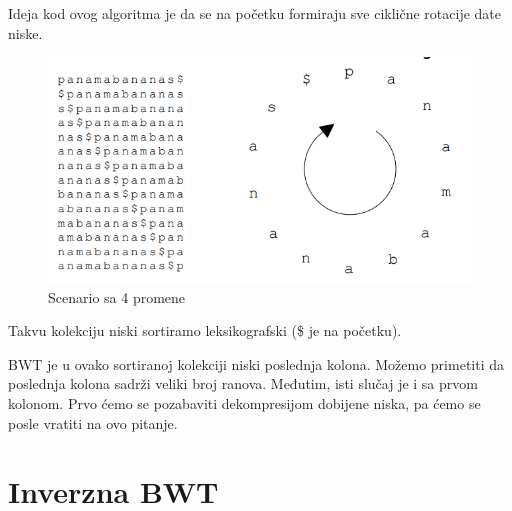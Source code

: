 Ideja kod ovog algoritma je da se na početku formiraju sve ciklične rotacije date niske.

\begin{figure}[h!]
\centering
\includegraphics[scale=0.7]{poglavlja/9/slike/SveCiklicneRotacije.png}
\caption{Scenario sa 4 promene}
\label{slika:X}
\end{figure}

Takvu kolekciju niski sortiramo leksikografski (\$ je na početku).

BWT je u ovako sortiranoj kolekciji niski poslednja kolona. Možemo primetiti da poslednja kolona sadrži veliki broj ranova. Međutim, isti slučaj je i sa prvom kolonom. Prvo ćemo se pozabaviti dekompresijom dobijene niska, pa ćemo se posle vratiti na ovo pitanje.


\section{Inverzna BWT}


